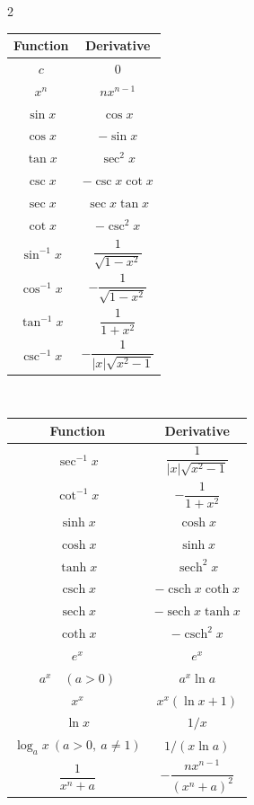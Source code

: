 \documentclass[10pt]{book}
\begin{document}
\setlength{\columnsep}{1pt}
\begin{multicols}{2}

  \begin{tabular}{cc}
    \toprule
    Function & Derivative \\
    \midrule
    $c$ & $0$ \\
    $x^n$ & $nx^{n-1}$ \\
    $\sin x$ & $\cos x$ \\
    $\cos x$ & $-\sin x$ \\
    $\tan x$ & $\sec^2 x$ \\
    $\csc x$ & $-\csc x \cot x$ \\
    $\sec x$ & $\sec x \tan x$ \\
    $\cot x$ & $-\csc^2 x$ \\
    $\sin^{-1} x$ & $\dfrac{1}{\sqrt{1-x^2}}$ \\
    $\cos^{-1} x$ & $-\dfrac{1}{\sqrt{1-x^2}}$ \\
    $\tan^{-1} x$ & $\dfrac{1}{1+x^2}$ \\
    $\csc^{-1} x$ & $-\dfrac{1}{|x|\sqrt{x^2-1}}$ \\
    \bottomrule
  \end{tabular}

  \columnbreak\

  \begin{tabular}{cc}
    \toprule
    Function & Derivative \\
    \midrule
    $\sec^{-1} x$ & $\dfrac{1}{|x|\sqrt{x^2-1}}$ \\
    $\cot^{-1} x$ & $-\dfrac{1}{1+x^2}$ \\
    $\sinh x$ & $\cosh x$ \\
    $\cosh x$ & $\sinh x$ \\
    $\tanh x$ & $\operatorname{sech}^2 x$ \\
    $\operatorname{csch} x$ & $-\operatorname{csch} x \coth x$ \\
    $\operatorname{sech} x$ & $-\operatorname{sech} x \tanh x$ \\
    $\coth x$ & $-\operatorname{csch}^2 x$ \\
    $e^x$ & $e^x$ \\
    $a^x \quad (a>0)$ & $a^x \ln a$ \\
    $x^x$ & $x^x(\ln x + 1)$ \\
    $\ln x$ & $1/x$ \\
    $\log_a x \ (a>0,\ a\neq 1)$ & $1/(x\ln a)$ \\
    $\dfrac{1}{x^n+a}$ & $-\dfrac{nx^{n-1}}{{(x^n+a)}^2}$ \\
    \bottomrule
  \end{tabular}

\end{multicols}
\end{document}
